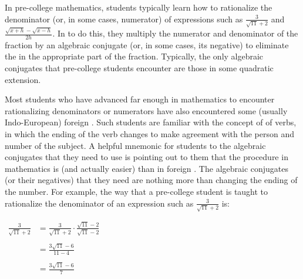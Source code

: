\documentclass[12pt]{article}
\begin{document}
In pre-college mathematics, students typically learn how to rationalize the denominator (or, in some cases, numerator) of expressions such as $\displaystyle \frac{3}{\sqrt{11}+2}$ and $\displaystyle \frac{\sqrt{x+h}-\sqrt{x-h}}{2h}$.  In  to do this, they multiply the numerator and denominator of the fraction by an algebraic conjugate (or, in some cases, its negative) to eliminate the  in the appropriate part of the fraction.  Typically, the only algebraic conjugates that pre-college students encounter are those in some quadratic extension.

Most students who have advanced far enough in mathematics to encounter rationalizing denominators or numerators have also encountered some (usually Indo-European) foreign .  Such students are familiar with the concept of  of verbs, in which the ending of the verb changes to make agreement with the person and number of the subject.  A helpful mnemonic for students to  the algebraic conjugates that they need to use is pointing out to them that the procedure in mathematics is  (and actually easier) than in foreign .  The algebraic conjugates (or their negatives) that they need are nothing more than changing the ending of the number.  For example, the way that a pre-college student is taught to rationalize the denominator of an expression such as $\displaystyle \frac{3}{\sqrt{11}+2}$ is:

\begin{center}
$\begin{array}{rl}
\displaystyle \frac{3}{\sqrt{11}+2} & \displaystyle =\frac{3}{\sqrt{11}+2} \cdot \frac{\sqrt{11}-2}{\sqrt{11}-2} \\
& \\
& \displaystyle =\frac{3\sqrt{11}-6}{11-4} \\
& \\
& \displaystyle =\frac{3\sqrt{11}-6}{7} \end{array}$
\end{center}
\end{document}
